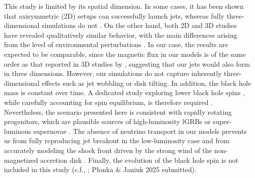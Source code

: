 \documentclass{ptapap}
\begin{document}
This study is limited by its spatial dimension. In some cases, it has been shown that axisymmetric (2D) setups can successfully launch jets, whereas fully three-dimensional simulations do not \citep[e.g.,][]{Moesta2014}. On the other hand, both 2D and 3D studies have revealed qualitatively similar behavior, with the main differences arising from the level of environmental perturbations \citep[e.g.,][]{magnetorotational1}. In our case, the results are expected to be comparable, since the magnetic flux in our models is of the same order as that reported in 3D studies by \citet{gottlieb2022a,gottlieb2022b}, suggesting that our jets would also form in three dimensions. However, our simulations do not capture inherently three-dimensional effects such as jet wobbling or disk tilting. In addition, the black hole mass is constant over time. A dedicated study exploring lower black hole spins \citep[e.g.,][]{Gottlieb2023lowspining}, while carefully accounting for spin equilibrium, is therefore required \citep[e.g.,][]{Issa2025b}. Nevertheless, the scenario presented here is consistent with rapidly rotating progenitors, which are plausible sources of high-luminosity lGRBs or super-luminous supernovae \citep[e.g.,][]{Aguilera-Dena2018ApJ}. The absence of neutrino transport in our models prevents us from fully reproducing jet breakout in the low-luminosity case and from accurately modeling the shock front driven by the strong wind of the non-magnetized accretion disk \citep[e.g.,][]{Moesta2014,magnetorotational1,Issa_2025,Janiuk2025NeutrinoLeakeage}. Finally, the evolution of the black hole spin is not included in this study (c.f., \citealt{Janiuk2023collapse}; Płonka \& Janiuk 2025 submitted).







\end{document}
